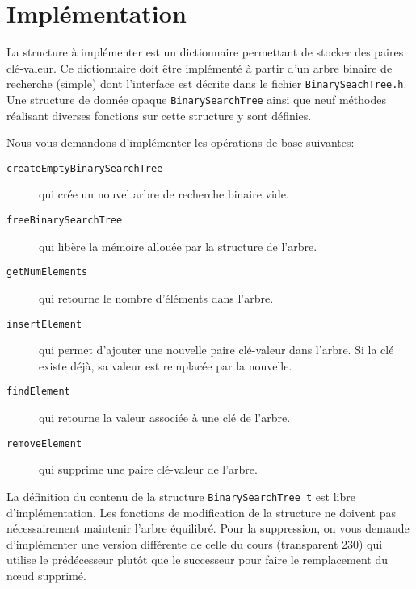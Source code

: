 \documentclass[a4paper,10pt]{article}
\begin{document}
\section{Implémentation}

La structure à implémenter est un dictionnaire permettant de stocker des paires
clé-valeur. Ce dictionnaire doit être implémenté à partir d'un arbre binaire de
recherche (simple) dont l'interface est décrite dans le fichier
\texttt{BinarySeachTree.h}. Une structure de donnée opaque
\texttt{BinarySearchTree} ainsi que neuf méthodes réalisant diverses fonctions
sur cette structure y sont définies.

Nous vous demandons d'implémenter les opérations de base suivantes:
\begin{description}
\item[\texttt{createEmptyBinarySearchTree}] qui crée un nouvel arbre de recherche binaire vide.
\item[\texttt{freeBinarySearchTree}]  qui libère la mémoire allouée par la structure de l'arbre.
\item[\texttt{getNumElements}] qui retourne le nombre d'éléments dans l'arbre.
\item[\texttt{insertElement}] qui permet d'ajouter une nouvelle paire clé-valeur dans l'arbre. Si la clé existe déjà, sa valeur est remplacée par la nouvelle.
\item[\texttt{findElement}] qui retourne la valeur associée à une clé de l'arbre.
\item[\texttt{removeElement}] qui supprime une paire clé-valeur de l'arbre.
\end{description}
La définition du contenu de la structure \texttt{BinarySearchTree\_t}
est libre d'implémentation. Les fonctions de modification de la
structure ne doivent pas nécessairement maintenir l'arbre
équilibré. Pour la suppression, on vous demande d'implémenter une
version différente de celle du cours (transparent 230) qui utilise le
prédécesseur plutôt que le successeur pour faire le remplacement du
n\oe ud supprimé.
\end{document}
